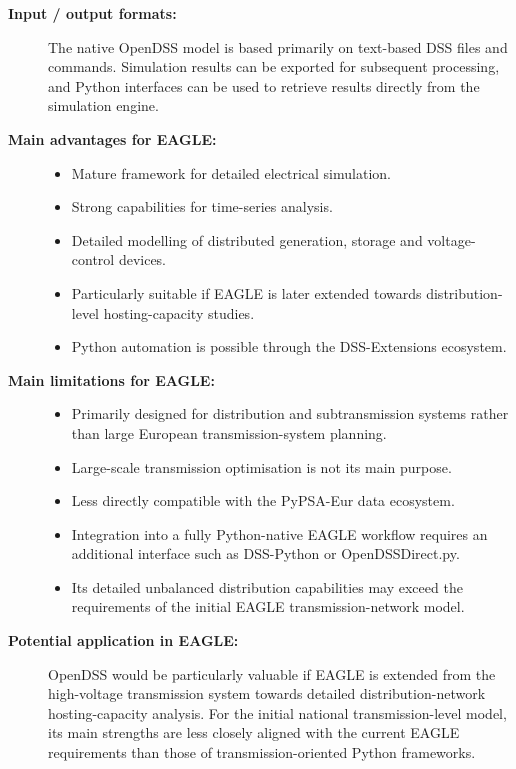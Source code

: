 \begin{description}
    \item[\textbf{Input / output formats:}]
    The native OpenDSS model is based primarily on text-based DSS files and
    commands. Simulation results can be exported for subsequent processing,
    and Python interfaces can be used to retrieve results directly from the
    simulation engine.

    \item[\textbf{Main advantages for EAGLE:}] \hfill
    \begin{itemize}
        \item Mature framework for detailed electrical simulation.
        \item Strong capabilities for time-series analysis.
        \item Detailed modelling of distributed generation, storage and
        voltage-control devices.
        \item Particularly suitable if EAGLE is later extended towards
        distribution-level hosting-capacity studies.
        \item Python automation is possible through the DSS-Extensions
        ecosystem.
    \end{itemize}

    \item[\textbf{Main limitations for EAGLE:}] \hfill
    \begin{itemize}
        \item Primarily designed for distribution and subtransmission
        systems rather than large European transmission-system planning.
        \item Large-scale transmission optimisation is not its main purpose.
        \item Less directly compatible with the PyPSA-Eur data ecosystem.
        \item Integration into a fully Python-native EAGLE workflow requires
        an additional interface such as DSS-Python or OpenDSSDirect.py.
        \item Its detailed unbalanced distribution capabilities may exceed
        the requirements of the initial EAGLE transmission-network model.
    \end{itemize}

    \item[\textbf{Potential application in EAGLE:}]
    OpenDSS would be particularly valuable if EAGLE is extended from the
    high-voltage transmission system towards detailed distribution-network
    hosting-capacity analysis. For the initial national transmission-level
    model, its main strengths are less closely aligned with the current
    EAGLE requirements than those of transmission-oriented Python
    frameworks.

\end{description}


